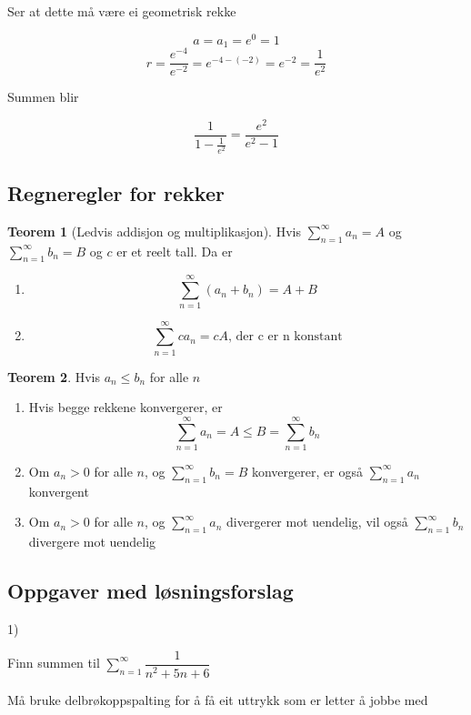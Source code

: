 \documentclass[11pt]{article}
\theoremstyle{definition}
\theoremstyle{definition}
\theoremstyle{definition}
\theoremstyle{definition}
\newtheorem{teo}{Teorem}[section]
\newenvironment{fteo}
{\begin{mdframed}[style=minstil]\begin{teo}}
		{\end{teo}\end{mdframed}}
\theoremstyle{definition}
\theoremstyle{definition}
\begin{document}
		Ser at dette må være ei geometrisk rekke
		
		\[a=a_1=e^0=1\]
		\[r=\dfrac{e^{-4}}{e^{-2}}=e^{-4-(-2)}=e^{-2}=\dfrac{1}{e^2}\]
				
		Summen blir
		
		\[\dfrac{1}{1-\frac{1}{e^2}}=\dfrac{e^2}{e^2-1} \]		
		\newpage
		
		\subsection{Regneregler for rekker}
		\begin{fteo}[Ledvis addisjon og multiplikasjon]
			Hvis \(\sum_{n=1}^{\infty}a_n=A\) og \(\sum_{n=1}^{\infty}b_n=B\) og \(c\) er et reelt tall. Da er
			\begin{enumerate}
				\item \[\sum_{n=1}^{\infty}(a_n+b_n)=A+B\]
				\item \[\sum_{n=1}^{\infty}ca_n=cA \text{, der c er n konstant}\]
			\end{enumerate}
		\end{fteo}
		
		\begin{fteo}
			Hvis \(a_n\leq b_n\) for alle \(n\)
			\begin{enumerate}
				\item Hvis begge rekkene konvergerer, er \[\sum_{n=1}^{\infty}a_n=A\leq B=\sum_{n=1}^{\infty}b_n\]
				\item Om \(a_n > 0\) for alle \(n\), og \(\displaystyle{\sum_{n=1}^{\infty}b_n=B}\) konvergerer, er også \(\displaystyle{\sum_{n=1}^{\infty}a_n}\) konvergent
				\item Om \(a_n>0\) for alle \(n\), og \(\displaystyle{\sum_{n=1}^{\infty}a_n}\) divergerer mot uendelig, vil også \(\displaystyle{\sum_{n=1}^{\infty}b_n} \) divergere mot uendelig
			\end{enumerate}
		\end{fteo} 
		
		\newpage
		
		\subsection{Oppgaver med løsningsforslag}

		1)
		
		Finn summen til \(\displaystyle{\sum_{n=1}^{\infty}\dfrac{1}{n^2+5n+6}}\)
		
		Må bruke delbrøkoppspalting for å få eit uttrykk som er letter å jobbe med
		
\end{document}
